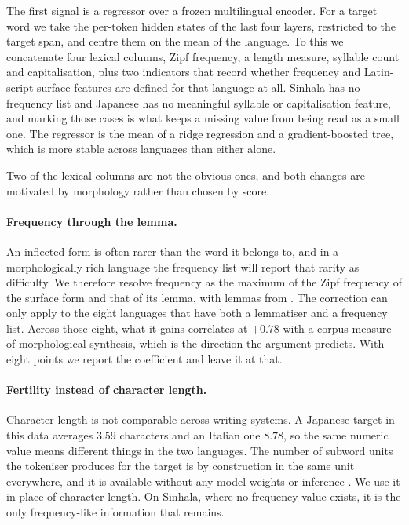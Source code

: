 The first signal is a regressor over a frozen multilingual encoder. For
a target word we take the per-token hidden states of the last four
layers, restricted to the target span, and centre them on the mean of
the language. To this we concatenate four lexical columns, Zipf
frequency, a length measure, syllable count and capitalisation, plus two
indicators that record whether frequency and Latin-script surface
features are defined for that language at all. Sinhala has no frequency
list and Japanese has no meaningful syllable or capitalisation feature,
and marking those cases is what keeps a missing value from being read as
a small one. The regressor is the mean of a ridge regression and a
gradient-boosted tree, which is more stable across languages than either
alone.

Two of the lexical columns are not the obvious ones, and both changes
are motivated by morphology rather than chosen by score.

\paragraph{Frequency through the lemma.} An inflected form is often
rarer than the word it belongs to, and in a morphologically rich
language the frequency list will report that rarity as difficulty. We
therefore resolve frequency as the maximum of the Zipf frequency of the
surface form and that of its lemma, with lemmas from
\citet{qi-etal-2020-stanza}. The correction can only apply to the eight
languages that have both a lemmatiser and a frequency list. Across those
eight, what it gains correlates at $+0.78$ with a corpus measure of
morphological synthesis, which is the direction the argument predicts.
With eight points we report the coefficient and leave it at that.

\paragraph{Fertility instead of character length.} Character length is
not comparable across writing systems. A Japanese target in this data
averages $3.59$ characters and an Italian one $8.78$, so the same
numeric value means different things in the two languages. The number of
subword units the tokeniser produces for the target is by construction
in the same unit everywhere, and it is available without any model
weights or inference \citep{rust-etal-2021-good}. We use it in place of
character length. On Sinhala, where no frequency value exists, it is the
only frequency-like information that remains.

